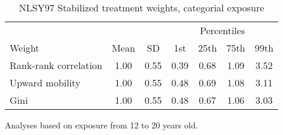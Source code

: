 \begin{table}[htp]
\centering
\footnotesize
\setlength{\tabcolsep}{10pt}
\renewcommand{\arraystretch}{1}
\begin{threeparttable}
\centering
\caption{NLSY97 Stabilized treatment weights, categorial exposure} 
\label{tab:ipt_weigths_q}
\begin{tabular}{lcccccc}
  \hline
\multicolumn{3}{c}{} & \multicolumn{4}{c}{Percentiles} \\ 
 \cmidrule{4-7} 
Weight & Mean & SD & 1st & 25th & 75th & 99th \\ 
  \hline
Rank-rank correlation & 1.00 & 0.55 & 0.39 & 0.68 & 1.09 & 3.52 \\ 
  Upward mobility & 1.00 & 0.55 & 0.48 & 0.69 & 1.08 & 3.11 \\ 
  Gini & 1.00 & 0.55 & 0.48 & 0.67 & 1.06 & 3.03 \\ 
   \hline
\end{tabular}
\begin{tablenotes}
\footnotesize
\item Analyses based on exposure from 12 to 20 years old. 
\end{tablenotes}
\end{threeparttable}
\end{table}
